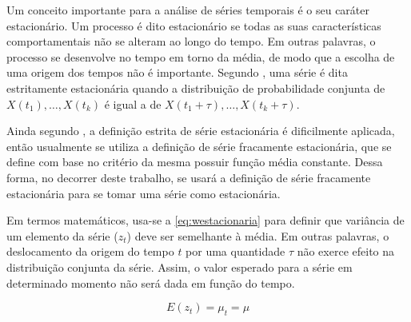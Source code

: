 \documentclass[
    12pt,
    oneside,
    a4paper,
    english,
    brazil
]{abntex2}
\begin{document}
Um conceito importante para a análise de séries temporais é o seu caráter estacionário. Um processo é dito estacionário se todas as suas características comportamentais não se alteram ao longo do tempo. Em outras palavras, o processo se desenvolve no tempo em torno da média, de modo que a escolha de uma origem dos tempos não é importante. Segundo , uma série é dita estritamente estacionária quando a distribuição de probabilidade conjunta de $X(t_1), \ldots, X(t_k)$ é igual a de $X(t_1 + \tau), \ldots, X(t_k + \tau)$.

Ainda segundo , a definição estrita de série estacionária é dificilmente aplicada, então usualmente se utiliza a definição de série fracamente estacionária, que se
define com base no critério da mesma possuir função média constante.
Dessa forma, no decorrer deste trabalho, se usará a definição de série fracamente estacionária para se tomar uma série como estacionária.

Em termos matemáticos, usa-se a \autoref{eq:westacionaria} para
definir que variância de um elemento da série ($z_t$) deve ser semelhante à média. Em outras palavras, o deslocamento da origem do tempo $t$ por uma quantidade $\tau$ não exerce efeito na distribuição conjunta da série. Assim, o valor esperado para a série em determinado momento não será dada em função do tempo.

\begin{equation}
    \label{eq:westacionaria}
    E(z_t) = \mu_t = \mu
\end{equation}





\end{document}
